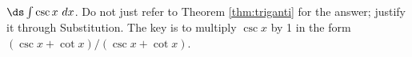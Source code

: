 {$\ds \int \csc x\ dx$. Do not just refer to Theorem \ref{thm:triganti} for the answer; justify it through Substitution.
}
{The key is to multiply $\csc x$ by 1 in the form $(\csc x+\cot x)/(\csc x+\cot x)$.
}

